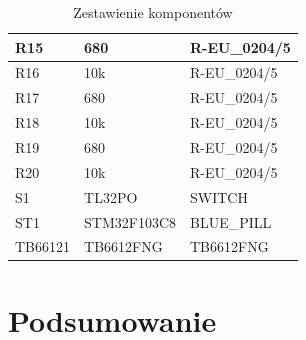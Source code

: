 \documentclass[10pt, a4paper]{article}
\begin{document}
\begin{table}[H]
\begin{tabular}{l|ll}
		R15     & 680         & R-EU\_0204/5    \\ \hline
		R16     & 10k         & R-EU\_0204/5    \\ \hline
		R17     & 680         & R-EU\_0204/5    \\ \hline
		R18     & 10k         & R-EU\_0204/5    \\ \hline
		R19     & 680         & R-EU\_0204/5    \\ \hline
		R20     & 10k         & R-EU\_0204/5    \\ \hline
		S1      & TL32PO      & SWITCH          \\ \hline
		ST1     & STM32F103C8 & BLUE\_PILL      \\ \hline
		TB66121 & TB6612FNG   & TB6612FNG       \\ \hline
	\end{tabular}
	\caption{Zestawienie komponentów}
\end{table}
\section{Podsumowanie}


\newpage
{}


\end{document}
